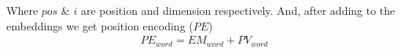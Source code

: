 \documentclass[%
	BCOR=8mm, %
	DIV=12,
	toc=bibliography, %
	toc=listof, %
	oneside, %
	egregdoesnotlikesansseriftitles, %
	]{scrbook}
\begin{document}
Where $pos$ \& $i$ are position and dimension respectively. And, after adding to the embeddings we get position encoding ($PE$)
\begin{equation}
\begin{aligned}
    PE_{word} =EM_{word}+PV_{word}\\
    \label{eq:PE}
\end{aligned}
\end{equation}

%
\end{document}
